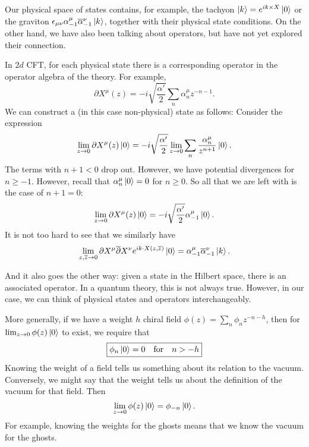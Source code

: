 Our physical space of states contains, for example, the tachyon $\ket{k} = e^{i k \times X} \ket{0}$ or the graviton $\epsilon_{\mu\nu} \alpha^{\mu}_{-1} \overline{\alpha}{}^{\nu}_{-1} \ket{k}$, together with their physical state conditions.
On the other hand, we have also been talking about operators, but have not yet explored their connection.

In $2d$ CFT, for each physical state there is a corresponding operator in the operator algebra of the theory.
For example, 
\begin{equation}
  \partial X^{\mu} (z) = -i \sqrt{\frac{\alpha'}{2}} \sum_n \alpha^{\mu}_n z^{-n-1}.
\end{equation}
We can construct a (in this case non-physical) state as follows:
Consider the expression
\begin{equation}
  \lim_{z \to 0} \partial X^{\mu}(z) \ket{0} = -i \sqrt{\frac{\alpha'}{2}} \lim_{z \to 0} \sum_n \frac{\alpha^{\mu}_n}{z^{n+1}} \ket{0}.
\end{equation}
The terms with $n+1 < 0$ drop out. However, we have potential divergences for $n \geq -1$.
However, recall that $\alpha^{\mu}_n \ket{0} = 0$ for $n \geq 0$. So all that we are left with is the case of $n+1 = 0$:
\begin{equation}
  \lim_{z \to 0}  \partial X^{\mu}(z) \ket{0} = - i \sqrt{\frac{\alpha'}{2}} \alpha^{\mu}_{-1} \ket{0}.
\end{equation}
It is not too hard to see that we similarly have
\begin{equation}
  \lim_{z, \overline{z}{} \to 0} \partial X^{\mu} \overline{\partial}{}X^{\nu} e^{i k \cdot X(z, \overline{z}{})}\ket{0} = \alpha^{\mu}_{-1} \overline{\alpha}{}^{\nu}_{-1} \ket{k}.
\end{equation}

And it also goes the other way: given a state in the Hilbert space, there is an associated operator.
In a quantum theory, this is not always true.
However, in our case, we can think of physical states and operators interchangeably.

More generally, if we have a weight $h$ chiral field $ \phi(z) = \sum_n \phi_n z^{-n - h}$, then for $ \lim_{z \to 0}  \phi(z) \ket{0} $ to exist, we require that
\begin{equation}
  \boxed{\phi_n \ket{0} = 0 \quad \text{for} \quad n> -h}
\end{equation}
Knowing the weight of a field tells us something about its relation to the vacuum. Conversely, we might say that the weight tells us about the definition of the vacuum for that field.
Then
\begin{equation}
  \lim_{z \to 0}  \phi(z) \ket{0} = \phi_{-n} \ket{0}.
\end{equation}
For example, knowing the weights for the ghosts means that we know the vacuum for the ghosts.


